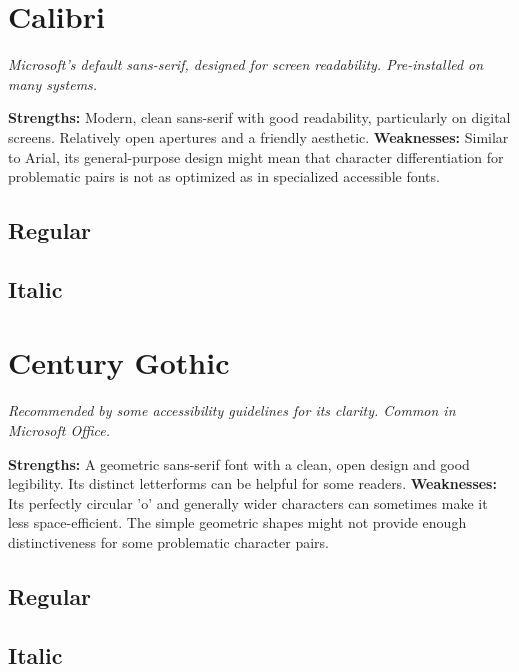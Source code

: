 \pagebreak
\section{Calibri}
\emph{Microsoft’s default sans-serif, designed for screen readability. Pre-installed on many systems.}
\begin{raggedright}
\textbf{Strengths:} Modern, clean sans-serif with good readability, particularly on digital screens. Relatively open apertures and a friendly aesthetic.
\textbf{Weaknesses:} Similar to Arial, its general-purpose design might mean that character differentiation for problematic pairs is not as optimized as in specialized accessible fonts.

\subsection{Regular}
\FontSample{\calibrifont}

\subsection{Italic}
\FontSample{{\calibrifont\itshape}}
\end{raggedright}


\pagebreak
\section{Century Gothic}
\emph{Recommended by some accessibility guidelines for its clarity. Common in Microsoft Office.}
\begin{raggedright}
\textbf{Strengths:} A geometric sans-serif font with a clean, open design and good legibility. Its distinct letterforms can be helpful for some readers.
\textbf{Weaknesses:} Its perfectly circular 'o' and generally wider characters can sometimes make it less space-efficient. The simple geometric shapes might not provide enough distinctiveness for some problematic character pairs.

\subsection{Regular}
\FontSample{\centurygothicfont}

\subsection{Italic}
\FontSample{{\centurygothicfont\itshape}}
\end{raggedright}

